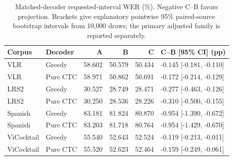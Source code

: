 \begin{table}[tb]
\centering\small
\setlength{\tabcolsep}{4pt}
\caption{Matched-decoder requested-interval WER (\%). Negative C--B favors projection. Brackets give explanatory pointwise 95\% paired-source bootstrap intervals from 10,000 draws; the primary adjusted family is reported separately.}
\label{tab:matched}
\begin{tabular}{llrrrl}
\toprule
Corpus & Decoder & A & B & C & C--B [95\% CI] (pp) \\
\midrule
VLR & Greedy & 58.602 & 50.579 & 50.434 & -0.145 [-0.181, -0.110] \\
VLR & Pure CTC & 58.971 & 50.862 & 50.691 & -0.172 [-0.214, -0.129] \\
LRS2 & Greedy & 30.527 & 28.749 & 28.471 & -0.277 [-0.463, -0.126] \\
LRS2 & Pure CTC & 30.250 & 28.536 & 28.226 & -0.310 [-0.500, -0.155] \\
Spanish & Greedy & 83.181 & 81.824 & 80.870 & -0.954 [-1.390, -0.672] \\
Spanish & Pure CTC & 83.203 & 81.718 & 80.764 & -0.954 [-1.429, -0.670] \\
ViCocktail & Greedy & 55.540 & 52.643 & 52.524 & -0.119 [-0.213, -0.011] \\
ViCocktail & Pure CTC & 55.520 & 52.623 & 52.464 & -0.159 [-0.249, -0.061] \\
\bottomrule
\end{tabular}
\end{table}
